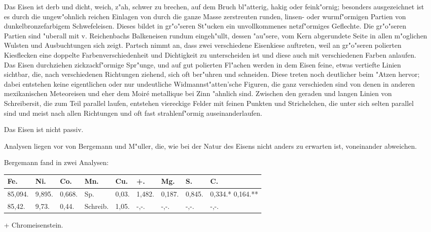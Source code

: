 \documentclass[a4paper, 11pt, oneside]{article}
\begin{document}
Das Eisen ist derb und dicht, weich, z"ah, schwer zu brechen, auf dem Bruch bl"atterig, hakig oder feink"ornig; besonders ausgezeichnet ist es durch die ungew"ohnlich reichen Einlagen von durch die ganze Masse zerstreuten runden, linsen- oder wurmf"ormigen Partien von dunkelbronzefarbigem Schwefeleisen. Dieses bildet in gr"o"seren St"ucken ein unvollkommenes netzf"ormiges Geflechte. Die gr"o"seren Partien sind "uberall mit v. Reichenbachs Balkeneisen rundum eingeh"ullt, dessen "au"sere, vom Kern abgerundete Seite in allen m"oglichen Wulsten und Ausbuchtungen sich zeigt. Partsch nimmt an, dass zwei verschiedene Eisenkiese auftreten, weil an gr"o"seren polierten Kiesflecken eine doppelte Farbenverschiedenheit und Dichtigkeit zu unterscheiden ist und diese auch mit verschiedenen Farben anlaufen. Das Eisen durchziehen zickzackf"ormige Spr"unge, und auf gut polierten Fl"achen werden in dem Eisen feine, etwas vertiefte Linien sichtbar, die, nach verschiedenen Richtungen ziehend, sich oft ber"uhren und schneiden. Diese treten noch deutlicher beim "Atzen hervor; dabei entstehen keine eigentlichen oder nur undeutliche Widmannst"atten'sche Figuren, die ganz verschieden sind von denen in anderen mexikanischen Meteoreisen und eher dem Moiré metallique bei Zinn "ahnlich sind. Zwischen den geraden und langen Linien von Schreibersit, die zum Teil parallel laufen, entstehen viereckige Felder mit feinen Punkten und Strichelchen, die unter sich selten parallel sind und meist nach allen Richtungen und oft fast strahlenf"ormig auseinanderlaufen.

Das Eisen ist nicht passiv.

Analysen liegen vor von Bergemann und M"uller, die, wie bei der Natur des Eisens nicht anders zu erwarten ist, voneinander abweichen.

Bergemann fand in zwei Analysen:
\begin{table}[H]
    \centering\swabfamily\Large
    \normalsize
    \begin{tabular}{l l l p{7mm} l l l l l}
        Fe. & Ni. & Co. & Mn. & Cu. & +. & Mg. & S. & C. \\ \hline
        85,094. & 9,895. & 0,668. & Sp. & 0,03. & 1,482. & 0,187. & 0,845. & 0,334.* 0,164.** \\
        85,42. & 9,73. & 0,44. & Schreib. & 1,05. & -,-. & -,-. & -,-. & -,-. \\
    \end{tabular}
\end{table}

+ Chromeisenstein.
\end{document}
